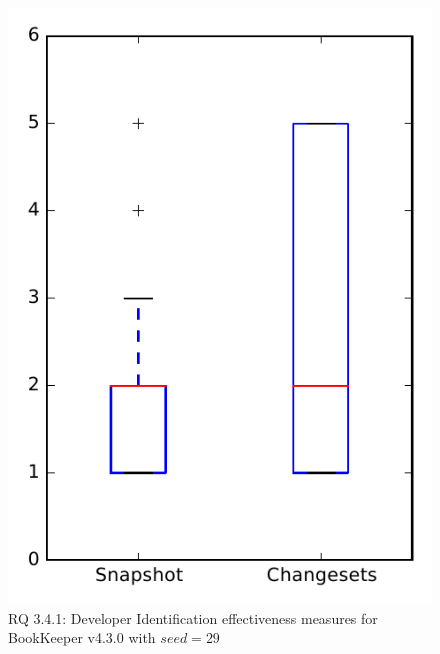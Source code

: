 
\begin{figure}
\centering
\includegraphics[height=0.4\textheight]{figures/dit_seed/rq1_bookkeeper_29}
\caption{RQ 3.4.1: Developer Identification effectiveness measures for BookKeeper v4.3.0 with $seed=29$}
\label{fig:dit_seed:rq1:bookkeeper}
\end{figure}
